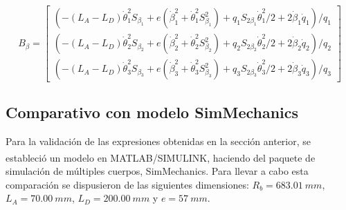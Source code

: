 \begin{equation}
    B_{\beta} = \left[ \begin{array}{c}
        \left(-(L_A - L_D)\dot{\theta}_1^2S_{\beta_1} + e\left(\dot{\beta}_1^2 + \dot{\theta}_1^2S_{\beta_1}^2\right) + q_{1}S_{2\beta_1}\dot{\theta}_1^2/2 + 2\dot{\beta}_{1}\dot{q}_1\right)/q_{1} \\
        \left(-(L_A - L_D)\dot{\theta}_2^2S_{\beta_2} + e\left(\dot{\beta}_2^2 + \dot{\theta}_2^2S_{\beta_2}^2\right) + q_{2}S_{2\beta_2}\dot{\theta}_2^2/2 + 2\dot{\beta}_{2}\dot{q}_2\right)/q_{2} \\
        \left(-(L_A - L_D)\dot{\theta}_3^2S_{\beta_3} + e\left(\dot{\beta}_3^2 + \dot{\theta}_3^2S_{\beta_3}^2\right) + q_{3}S_{2\beta_3}\dot{\theta}_3^2/2 + 2\dot{\beta}_{3}\dot{q}_3\right)/q_{3}
    \end{array} \right]
\end{equation}

\newpage
\subsection{Comparativo con modelo SimMechanics}
Para la validación de las expresiones obtenidas en la sección anterior, se estableció un modelo en MATLAB/SIMULINK\textsuperscript{\textcopyright}, haciendo del paquete de simulación de múltiples cuerpos, SimMechanics. Para llevar a cabo esta comparación se dispusieron de las siguientes dimensiones: $R_b = 683.01~mm$, $L_A = 70.00~mm$, $L_D = 200.00~mm$ y $e = 57~mm$.

